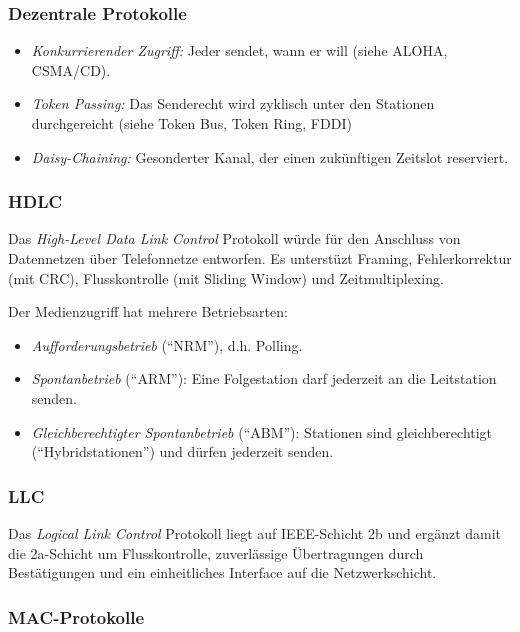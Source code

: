 \documentclass[a4paper,parskip=half*,DIV=15,fontsize=11pt]{scrartcl}
\begin{document}
\subsubsection{Dezentrale Protokolle}

\begin{itemize}
\item \emph{Konkurrierender Zugriff:} Jeder sendet, wann er will (siehe ALOHA, CSMA/CD).
\item \emph{Token Passing:} Das Senderecht wird zyklisch unter den Stationen durchgereicht (siehe Token Bus, Token Ring, FDDI)
\item \emph{Daisy-Chaining:} Gesonderter Kanal, der einen zukünftigen Zeitslot reserviert.
\end{itemize}

\subsubsection{HDLC}

Das \emph{High-Level Data Link Control} Protokoll würde für den Anschluss von Datennetzen über Telefonnetze entworfen. Es unterstüzt Framing, Fehlerkorrektur (mit CRC), Flusskontrolle (mit Sliding Window) und Zeitmultiplexing.

Der Medienzugriff hat mehrere Betriebsarten:
\begin{itemize}
\item \emph{Aufforderungsbetrieb} (``NRM''), d.h. Polling.
\item \emph{Spontanbetrieb} (``ARM''): Eine Folgestation darf jederzeit an die Leitstation senden.
\item \emph{Gleichberechtigter Spontanbetrieb} (``ABM''): Stationen sind gleichberechtigt (``Hybridstationen'') und dürfen jederzeit senden.
\end{itemize}

\subsubsection{LLC}

Das \emph{Logical Link Control} Protokoll liegt auf IEEE-Schicht 2b und ergänzt damit die 2a-Schicht um Flusskontrolle, zuverlässige Übertragungen durch Bestätigungen und ein einheitliches Interface auf die Netzwerkschicht.

\subsubsection{MAC-Protokolle}
\end{document}
